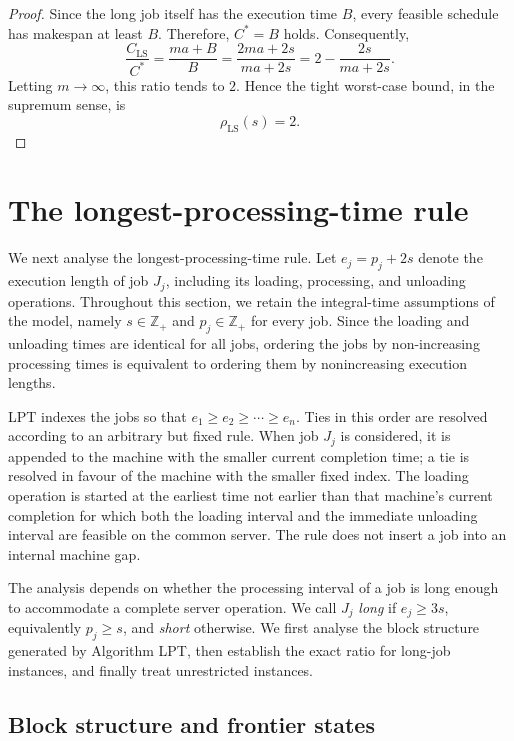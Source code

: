 \documentclass[11pt]{article}
\begin{document}
\begin{proof}
Since the long job itself has the execution time \(B\), every feasible schedule has makespan at least \(B\). Therefore, \(C^*=B\) holds.
Consequently,
\[
\frac{C_{\mathrm{LS}}}{C^*}
=
\frac{ma+B}{B}
=
\frac{2ma+2s}{ma+2s}
=
2-\frac{2s}{ma+2s}.
\]
Letting \(m\to\infty\), this ratio tends to \(2\). Hence the tight worst-case bound,
in the supremum sense, is
\[
\rho_{\mathrm{LS}}(s)=2.
\]
\end{proof}

\section{The longest-processing-time rule}
\label{sec:lpt_equal_s}

We next analyse the longest-processing-time rule. Let \(e_j=p_j+2s\) denote the execution length of job \(J_j\), including its loading, processing,
and unloading operations. Throughout this section, we retain the integral-time
assumptions of the model, namely \(s\in\mathbb Z_{+}\) and
\(p_j\in\mathbb Z_{+}\) for every job. Since the loading and unloading times
are identical for all jobs, ordering the jobs by non-increasing processing times
is equivalent to ordering them by nonincreasing execution lengths.

LPT indexes the jobs so that \(e_1\ge e_2\ge\cdots\ge e_n\).
Ties in this order are resolved according to an arbitrary but fixed rule. When
job \(J_j\) is considered, it is appended to the machine with the smaller
current completion time; a tie is resolved in favour of the machine with the
smaller fixed index. The loading operation is started at the earliest time not earlier
than that machine's current completion for which both the loading interval and the
immediate unloading interval are feasible on the common server. The rule does not
insert a job into an internal
machine gap.

The analysis depends on whether the processing interval of a job is long enough
to accommodate a complete server operation. We call \(J_j\) \emph{long} if \(e_j\ge3s\), equivalently \(p_j\ge s\), and \emph{short} otherwise. We first analyse the block structure generated by Algorithm 
LPT, then establish the exact ratio for long-job instances, and finally treat
unrestricted instances.

\subsection{Block structure and frontier states}
\label{subsec:lpt-block-structure}
\end{document}
